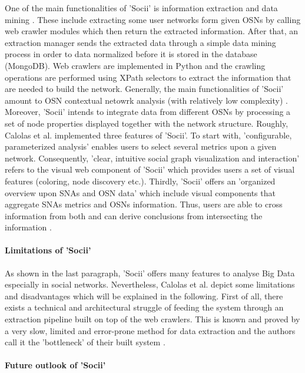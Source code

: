 One of the main functionalities of 'Socii' is information extraction and data mining \cite[p.223]{trends_nosql}. These include extracting some user networks form given OSNs by calling web crawler modules which then return the extracted information. After that, an extraction manager sends the extracted data through a simple data mining process in order to data normalized before it is stored in the database (MongoDB). Web crawlers are implemented in Python and the crawling operations are performed using XPath selectors to extract the information that are needed to build the network.
Generally, the main functionalities of 'Socii' amount to OSN contextual netowrk analysis (with relatively low complexity) \cite[p.227]{trends_nosql}. Moreover, 'Socii' intends to integrate data from different OSNs by processing a set of node properties displayed together with the network structure. Roughly, Calolas et al. implemented three features of 'Socii'. To start with, 'configurable, parameterized analysis' enables users to select several metrics upon a given network. Consequently, 'clear, intuitive social graph visualization and interaction' refers to the visual web component of 'Socii' which provides users a set of visual features (coloring, node discovery etc.). Thirdly, 'Socii' offers an 'organized overview upon SNAs and OSN data' which include visual components that aggregate SNAs metrics and OSNs information. Thus, users are able to cross information from both and can derive conclusions from intersecting the information \cite{trends_nosql}. 

\paragraph{Limitations of 'Socii'}

As shown in the last paragraph, 'Socii' offers many features to analyse Big Data especially in social networks. Nevertheless, Calolas et al. depict some limitations and disadvantages which will be explained in the following. 
First of all, there exists a technical and architectural struggle of feeding the system through an extraction pipeline built on top of the web crawlers. This is known and proved by a very slow, limited and error-prone method for data extraction and the authors call it the 'bottleneck' of their built system \cite [p.227]{trends_nosql}. 

\paragraph{Future outlook of 'Socii'}

